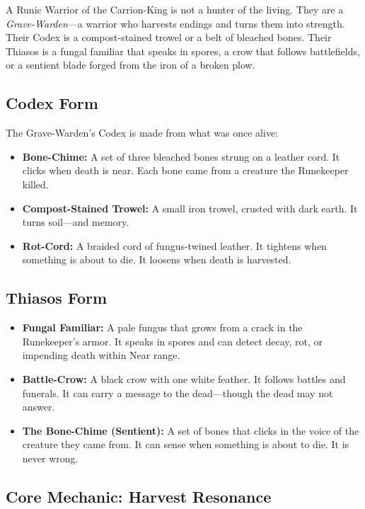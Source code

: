A Runic Warrior of the Carrion-King is not a hunter of the living. They are a \textit{Grave-Warden}—a warrior who harvests endings and turns them into strength. Their Codex is a compost-stained trowel or a belt of bleached bones. Their Thiasos is a fungal familiar that speaks in spores, a crow that follows battlefields, or a sentient blade forged from the iron of a broken plow.

\subsection{Codex Form}

The Grave-Warden's Codex is made from what was once alive:

\begin{itemize}
\item \textbf{Bone-Chime:} A set of three bleached bones strung on a leather cord. It clicks when death is near. Each bone came from a creature the Runekeeper killed.
\item \textbf{Compost-Stained Trowel:} A small iron trowel, crusted with dark earth. It turns soil—and memory.
\item \textbf{Rot-Cord:} A braided cord of fungus-twined leather. It tightens when something is about to die. It loosens when death is harvested.
\end{itemize}

\subsection{Thiasos Form}

\begin{itemize}
\item \textbf{Fungal Familiar:} A pale fungus that grows from a crack in the Runekeeper's armor. It speaks in spores and can detect decay, rot, or impending death within Near range.
\item \textbf{Battle-Crow:} A black crow with one white feather. It follows battles and funerals. It can carry a message to the dead—though the dead may not answer.
\item \textbf{The Bone-Chime (Sentient):} A set of bones that clicks in the voice of the creature they came from. It can sense when something is about to die. It is never wrong.
\end{itemize}

\subsection{Core Mechanic: Harvest Resonance}

